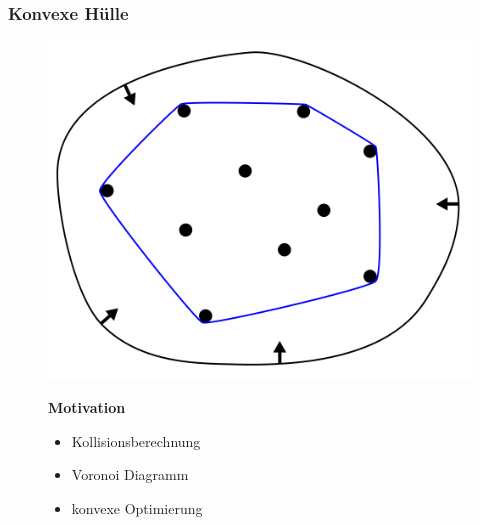 \begin{frame}
	\frametitle{Konvexe Hülle}
\begin{figure}[htbp]
  \centering
  \begin{minipage}[b]{.48\linewidth}
    \includegraphics[width=\linewidth]{bilder/konvexeHuelle.png}
  \end{minipage}
  \hfill
  \begin{minipage}[b]{.48\linewidth}
\textbf{Motivation}
\begin{itemize}
	\item Kollisionsberechnung
	\item Voronoi Diagramm
	\item konvexe Optimierung
\end{itemize}
\hspace{0pt}\\\\
\end{minipage}
\end{figure}
\end{frame}




